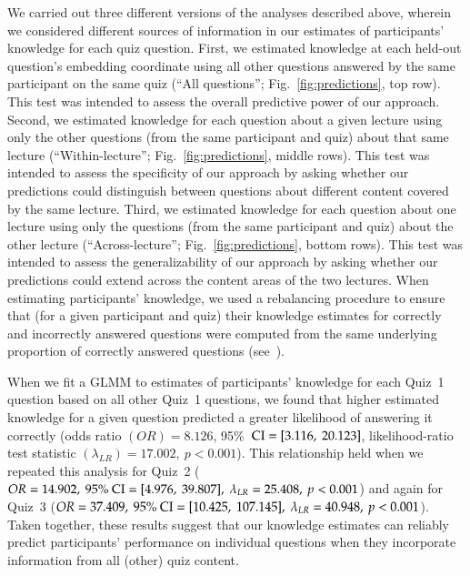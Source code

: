 \documentclass[10pt]{article}
\renewcommand{\nameref}[1]{\textit{\oldnameref{#1}}}
\begin{document}
We carried out three different versions of the analyses described above,
wherein we considered different sources of information in our estimates of
participants' knowledge for each quiz question. First, we estimated knowledge
at each held-out question's embedding coordinate using all other questions
answered by the same participant on the same quiz (``All questions'';
Fig.~\ref{fig:predictions}, top row). This test was intended to assess the
overall predictive power of our approach. Second, we estimated knowledge for
each question about a given lecture using only the other questions (from the
same participant and quiz) about that same lecture
(``Within-lecture''; Fig.~\ref{fig:predictions}, middle rows). This test was
intended to assess the specificity of our approach by asking whether
our predictions could distinguish between questions about different content
covered by the same lecture. Third, we estimated knowledge for each question
about one lecture using only the questions (from the same participant and quiz)
about the other lecture (``Across-lecture'';
Fig.~\ref{fig:predictions}, bottom rows). This test was intended to assess the
generalizability of our approach by asking whether our predictions
could extend across the content areas of the two lectures. When estimating
participants' knowledge, we used a rebalancing procedure to ensure that (for a
given participant and quiz) their knowledge estimates for correctly and
incorrectly answered questions were computed from the same underlying proportion
of correctly answered questions (see~\nameref{subsec:glmm}).

When we fit a GLMM to estimates of participants' knowledge for each Quiz~1
question based on all other Quiz~1 questions, we found that higher estimated
knowledge for a given question predicted a greater likelihood of answering it
correctly (odds ratio $(OR) = 8.126$, 95\%\ $\textnormal{CI} = [3.116,\
20.123]$, likelihood-ratio test statistic $(\lambda_{LR}) = 17.002,\ p <
0.001$). This relationship held when we repeated this analysis for Quiz~2 ($OR
= 14.902,\ 95\%\ \textnormal{CI} = [4.976,\ 39.807],\ \lambda_{LR} = 25.408,\
p < 0.001$) and again for Quiz~3 ($OR = 37.409,\ 95\%\ \textnormal{CI} =
[10.425,\ 107.145],\ \lambda_{LR} = 40.948,\ p < 0.001$). Taken together, these
results suggest that our knowledge estimates can reliably predict participants'
performance on individual questions when they incorporate information from all
(other) quiz content.
\end{document}

